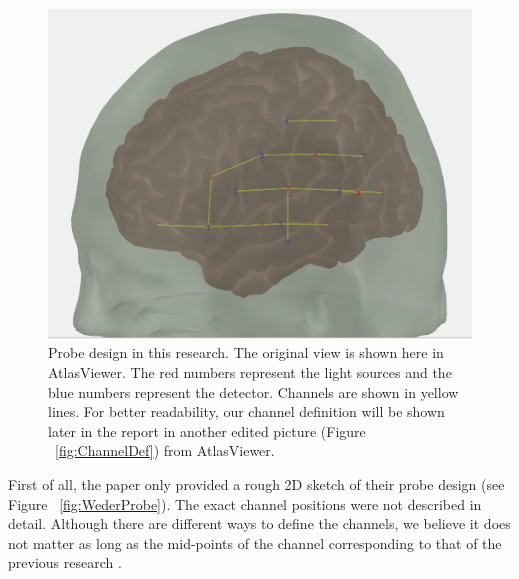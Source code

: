 \begin{figure}[H]
  \centering
    \includegraphics[scale=.32]{bilder/atlas_probe.png}
  \caption{Probe design in this research. The original view is shown here in AtlasViewer. The red numbers represent the light sources and the blue numbers represent the detector. Channels are shown in yellow lines. For better readability, our channel definition will be shown later in the report in another edited picture (Figure ~\ref{fig:ChannelDef}) from AtlasViewer. }
  \label{fig:atlas}
\end{figure}


First of all, the paper only provided a rough 2D sketch of their probe design (see Figure ~\ref{fig:WederProbe}). The exact channel positions were not described in detail. Although there are different ways to define the channels, we believe it does not matter as long as the mid-points of the channel corresponding to that of the previous research \citep {Weder2018}.

